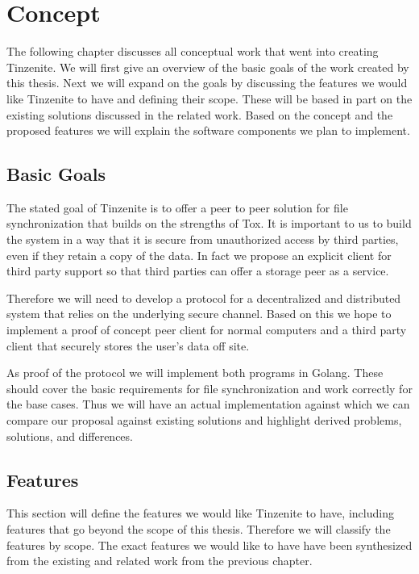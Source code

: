 \chapter{Concept}
\label{chap:concept}

The following chapter discusses all conceptual work that went into creating Tinzenite.
We will first give an overview of the basic goals of the work created by this thesis.
Next we will expand on the goals by discussing the features we would like Tinzenite to have and defining their scope.
These will be based in part on the existing solutions discussed in the related work.
Based on the concept and the proposed features we will explain the software components we plan to implement.

\section{Basic Goals}
\label{sec:Basic Goals}

The stated goal of Tinzenite is to offer a peer to peer solution for file synchronization that builds on the strengths of Tox.
It is important to us to build the system in a way that it is secure from unauthorized access by third parties, even if they retain a copy of the data.
In fact we propose an explicit client for third party support so that third parties can offer a storage peer as a service.

Therefore we will need to develop a protocol for a decentralized and distributed system that relies on the underlying secure channel.
Based on this we hope to implement a proof of concept peer client for normal computers and a third party client that securely stores the user's data off site.

As proof of the protocol we will implement both programs in Golang.
These should cover the basic requirements for file synchronization and work correctly for the base cases.
Thus we will have an actual implementation against which we can compare our proposal against existing solutions and highlight derived problems, solutions, and differences.

\section{Features}
\label{sec:Features}

This section will define the features we would like Tinzenite to have, including features that go beyond the scope of this thesis.
Therefore we will classify the features by scope.
The exact features we would like to have have been synthesized from the existing and related work from the previous chapter.

